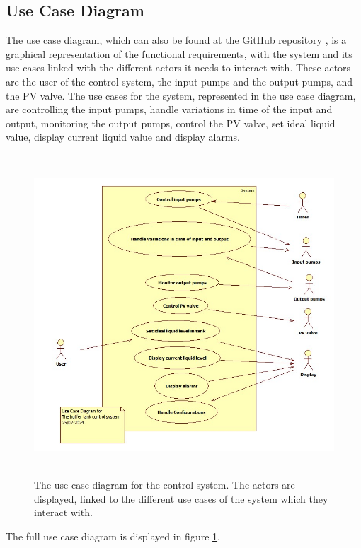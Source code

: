 \documentclass[11pt, A4paper, english]{article}
\begin{document}
		\subsection{Use Case Diagram}
The use case diagram, which can also be found at the GitHub repository \cite{github}, is a graphical representation of the functional requirements, with the system and its use cases linked with the different actors it needs to interact with. These actors are the user of the control system, the input pumps and the output pumps, and the PV valve. The use cases for the system, represented in the use case diagram, are controlling the input pumps, handle variations in time of the input and output, monitoring the output pumps, control the PV valve, set ideal liquid value, display current liquid value and display alarms.
			\begin{figure}[H]
\includegraphics[width=12cm, height=12cm]{UseCaseDiagram.jpg}
\caption{The use case diagram for the control system. The actors are displayed, linked to the different use cases of the system which they interact with.}
\label{im:UCD}
			\end{figure}
The full use case diagram is displayed in figure \ref{im:UCD}.
\end{document}
